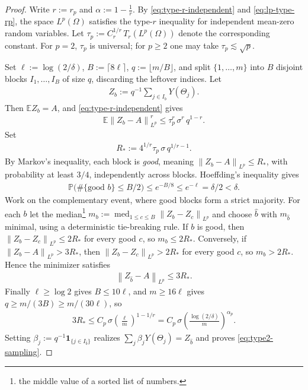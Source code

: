 \documentclass[12pt]{article}
\numberwithin{equation}{section}
\numberwithin{figure}{section}
\numberwithin{equation}{section}
\newcommand{\norm}[1]{\left\|#1\right\|}
\DeclareMathOperator{\med}{med}
\begin{document}
\begin{proof}
Write $r:=r_p$ and $\alpha:=1-\tfrac1r$. By \eqref{eq:type-r-independent} and 
\eqref{eq:lp-type-rp}, the space $L^p(\Omega)$ satisfies the type-$r$ inequality 
for independent mean-zero random variables. Let $\tau_p := C_r^{1/r}\,T_r(L^p(\Omega))$ 
denote the corresponding constant. For $p=2$, $\tau_p$ is universal; for $p\ge2$ one may 
take $\tau_p\lesssim\sqrt p$.

Set $\ell:=\log(2/\delta)$, $B:=\lceil8\ell\rceil$, $q:=\lfloor m/B\rfloor$, and
split $\{1,\dots,m\}$ into $B$ disjoint blocks $I_1,\dots,I_B$ of size $q$,
discarding the leftover indices. Let
\begin{align*}
    Z_b:=q^{-1}\sum_{j\in I_b}Y(\Theta_j).
\end{align*}
Then $\mathbb E Z_b=A$, and \eqref{eq:type-r-independent} gives
\begin{align*}
    \mathbb E\norm{Z_b-A}_{L^p}^r
    \le \tau_p^r\,\sigma^r\,q^{1-r}.
\end{align*}
Set
\begin{align*}
    R_\ast:=4^{1/r}\tau_p\,\sigma\,q^{1/r-1}.
\end{align*}
By Markov's inequality, each block is \emph{good}, meaning
$\norm{Z_b-A}_{L^p}\le R_\ast$, with probability at least $3/4$, independently
across blocks. Hoeffding's inequality gives
\begin{align*}
    \mathbb P\big(\#\{\text{good }b\}\le B/2\big)\le e^{-B/8}\le e^{-\ell}
    =\delta/2 < \delta.
\end{align*}
Work on the complementary event, where good blocks form a strict majority. For
each $b$ let the median\footnote{the middle value of a sorted 
list of numbers.} $m_b:=\med_{1\le c\le B}\norm{Z_b-Z_c}_{L^p}$ and choose
$\widehat b$ with $m_{\widehat b}$ minimal, using a deterministic tie-breaking
rule. If $b$ is good, then $\norm{Z_b-Z_c}_{L^p}\le2R_\ast$ for every good $c$,
so $m_b\le2R_\ast$. Conversely, if $\norm{Z_b-A}_{L^p}>3R_\ast$, then
$\norm{Z_b-Z_c}_{L^p}>2R_\ast$ for every good $c$, so $m_b>2R_\ast$. Hence the
minimizer satisfies
\begin{align*}
    \norm{Z_{\widehat b}-A}_{L^p}\le3R_\ast .
\end{align*}
Finally $\ell\ge\log2$ gives $B\le10\ell$, and $m\ge16\ell$ gives
$q\ge m/(3B)\ge m/(30\ell)$, so
\begin{align*}
    3R_\ast
    \le C_p\,\sigma\left(\frac{\ell}{m}\right)^{1-1/r}
    = C_p\,\sigma\left(\frac{\log(2/\delta)}{m}\right)^{\alpha_p}.
\end{align*}
Setting $\beta_j:=q^{-1}\mathbf 1_{\{j\in I_{\widehat b}\}}$ realizes
$\sum_j\beta_jY(\Theta_j)=Z_{\widehat b}$ and proves \eqref{eq:type2-sampling}.
\end{proof}
\end{document}
